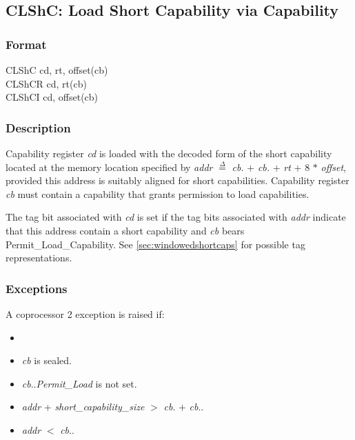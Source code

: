 \clearpage
{}
{}
\subsection*{CLShC: Load Short Capability via Capability}

\subsubsection*{Format}

CLShC cd, rt, offset(cb) \\
CLShCR cd, rt(cb) \\
CLShCI cd, offset(cb)


\subsubsection*{Description}

Capability register \emph{cd} is loaded with the decoded form of the short
capability located at the memory location specified by
%
\emph{addr} $\stackrel{\Delta}{=}$ \emph{cb.\cbase{}} $+$
\emph{cb.\coffset{}} $+$ \emph{rt} $+$ 8 $*$ \emph{offset},
%
provided this address is suitably aligned for short capabilities.
%
Capability register \emph{cb} must contain a capability that grants
permission to load capabilities.

The tag bit associated with \emph{cd} is set if the tag bits associated with
\emph{addr} indicate that this address contain a short capability and
\emph{cb} bears Permit\_Load\_Capability.  See
\cref{sec:windowedshortcaps} for possible tag representations.


\subsubsection*{Exceptions}

A coprocessor 2 exception is raised if:

\begin{itemize}
\item
\cchecktag{}
\item
\emph{cb} is sealed.
\item
\emph{cb}.\cperms.\emph{Permit\_Load} is not set.
\item
\emph{addr} + \emph{short\_capability\_size} $>$ \emph{cb}.\cbase{} $+$ \emph{cb}.\clength{}.
\item
\emph{addr} $<$ \emph{cb}.\cbase{}.
\end{itemize}

